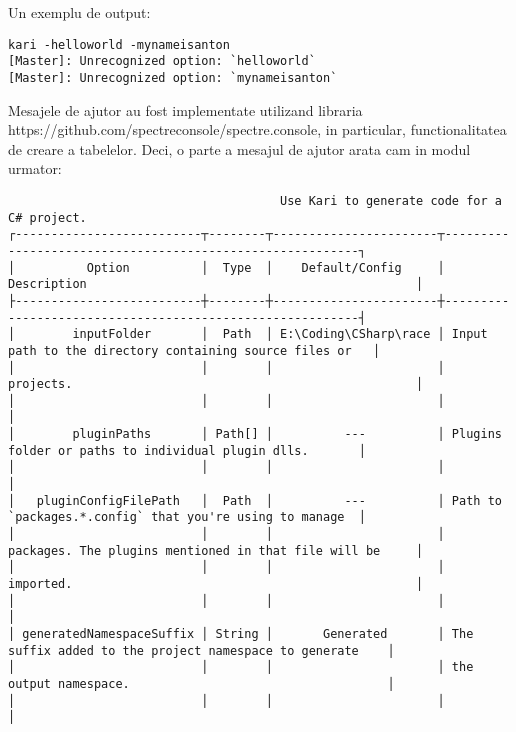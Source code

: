 \documentclass{report}
\begin{document}
Un exemplu de output:

\begin{verbatim}
kari -helloworld -mynameisanton
[Master]: Unrecognized option: `helloworld`
[Master]: Unrecognized option: `mynameisanton`
\end{verbatim}

Mesajele de ajutor au fost implementate utilizand libraria
https://github.com/spectreconsole/spectre.console, in particular,
functionalitatea de creare a tabelelor. Deci, o parte a mesajul de
ajutor arata cam in modul urmator:

\begin{verbatim}
                                      Use Kari to generate code for a C# project.
┌--------------------------┬--------┬-----------------------┬----------------------------------------------------------┐
│          Option          │  Type  │    Default/Config     │ Description                                              │
├--------------------------┼--------┼-----------------------┼----------------------------------------------------------┤
│        inputFolder       │  Path  │ E:\Coding\CSharp\race │ Input path to the directory containing source files or   │
│                          │        │                       │ projects.                                                │
│                          │        │                       │                                                          │
│        pluginPaths       │ Path[] │          ---          │ Plugins folder or paths to individual plugin dlls.       │
│                          │        │                       │                                                          │
│   pluginConfigFilePath   │  Path  │          ---          │ Path to `packages.*.config` that you're using to manage  │
│                          │        │                       │ packages. The plugins mentioned in that file will be     │
│                          │        │                       │ imported.                                                │
│                          │        │                       │                                                          │
│ generatedNamespaceSuffix │ String │       Generated       │ The suffix added to the project namespace to generate    │
│                          │        │                       │ the output namespace.                                    │
│                          │        │                       │                                                          │
\end{verbatim}
\end{document}
